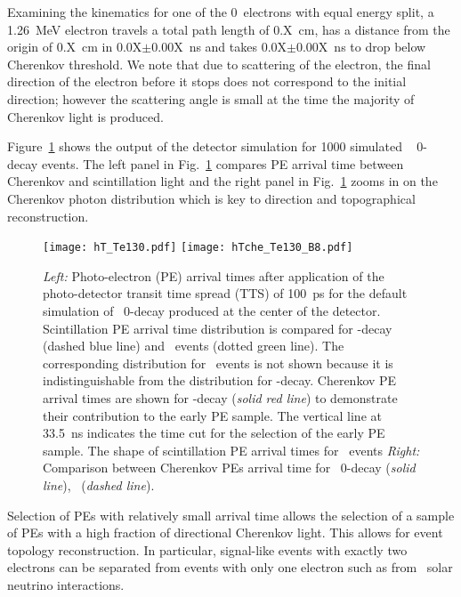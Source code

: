 Examining the kinematics for one of the 0\nbb~electrons with equal energy split, a 1.26~MeV electron travels a total path length of 0.X~cm, 
has a distance from the origin of 0.X~cm in 0.0X$\pm$0.00X~ns  and takes 0.0X$\pm$0.00X~ns to drop below Cherenkov threshold. 
We note that due to scattering of the electron, the final direction of the electron before it stops does not correspond to the initial 
direction; however the scattering angle is small at the time the majority of Cherenkov light is produced.

Figure~\ref{fig:ArrivalTimeDist} shows the output of the detector simulation for 1000 simulated \Te~ 0\nbb-decay 
events. The left panel in Fig.~\ref{fig:ArrivalTimeDist} compares PE arrival time between Cherenkov and scintillation light  
and the right panel in Fig.~\ref{fig:ArrivalTimeDist} zooms in on the Cherenkov photon distribution which is key to direction and 
topographical reconstruction.


\begin{figure}[ht]
  \centering
  \texttt{[image: hT\_Te130.pdf]}
  \texttt{[image: hTche\_Te130\_B8.pdf]}
  \caption{\emph{Left:} Photo-electron (PE) arrival times after
    application of the photo-detector transit time spread (TTS) of 100~ps for the default simulation 
    of \Te~0\nbb-decay produced at the center of the detector. 
    Scintillation PE arrival time distribution is compared for \nbb-decay (dashed blue line) and
    \Cten~events (dotted green line). The corresponding distribution for \B~events is not shown
    because it is indistinguishable from the distribution for \nbb-decay. Cherenkov PE arrival
    times are shown for \nbb-decay (\emph{solid red line}) to demonstrate their contribution to the early PE sample.
    The vertical line at 33.5~ns indicates the time cut for the selection of the early PE sample.
    The shape of scintillation PE arrival times for \B~events
    \emph{Right:} Comparison between Cherenkov PEs arrival time for \Te~0\nbb-decay (\emph{solid line}), 
    \B~(\emph{dashed line}).}
\label{fig:ArrivalTimeDist}
\end{figure}


Selection of PEs with relatively small arrival time allows the selection of a sample of PEs with a high fraction of directional Cherenkov light.
This allows for event topology reconstruction. In particular, signal-like events with exactly two electrons can be separated from events 
with only one electron such as from \B~solar neutrino interactions.


